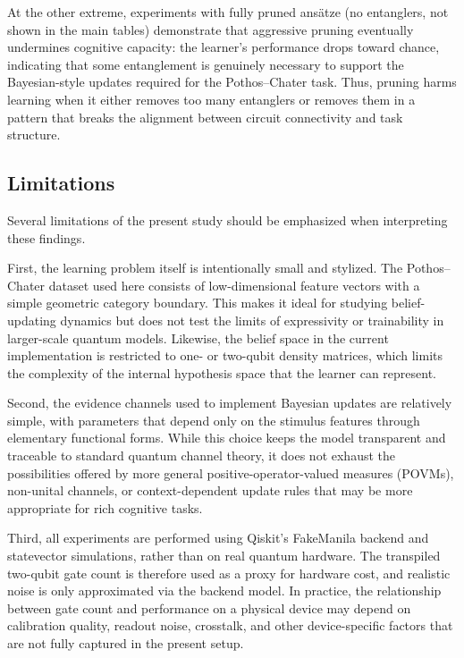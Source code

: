 \documentclass[conference]{IEEEtran}
\begin{document}
At the other extreme, experiments with fully pruned ansätze (no entanglers,
not shown in the main tables) demonstrate that aggressive pruning eventually
undermines cognitive capacity: the learner’s performance drops toward chance,
indicating that some entanglement is genuinely necessary to support the
Bayesian-style updates required for the Pothos--Chater task. Thus, pruning
harms learning when it either removes too many entanglers or removes them in a
pattern that breaks the alignment between circuit connectivity and task
structure.

\subsection{Limitations}

Several limitations of the present study should be emphasized when interpreting
these findings.

First, the learning problem itself is intentionally small and stylized. The
Pothos--Chater dataset used here consists of low-dimensional feature vectors
with a simple geometric category boundary. This makes it ideal for studying
belief-updating dynamics but does not test the limits of expressivity or
trainability in larger-scale quantum models. Likewise, the belief space in the
current implementation is restricted to one- or two-qubit density matrices,
which limits the complexity of the internal hypothesis space that the learner
can represent.

Second, the evidence channels used to implement Bayesian updates are relatively
simple, with parameters that depend only on the stimulus features through
elementary functional forms. While this choice keeps the model transparent and
traceable to standard quantum channel theory, it does not exhaust the
possibilities offered by more general positive-operator-valued measures
(POVMs), non-unital channels, or context-dependent update rules that may be
more appropriate for rich cognitive tasks.

Third, all experiments are performed using Qiskit’s FakeManila backend and
statevector simulations, rather than on real quantum hardware. The transpiled
two-qubit gate count is therefore used as a proxy for hardware cost, and
realistic noise is only approximated via the backend model. In practice, the
relationship between gate count and performance on a physical device may
depend on calibration quality, readout noise, crosstalk, and other
device-specific factors that are not fully captured in the present setup.
\end{document}
